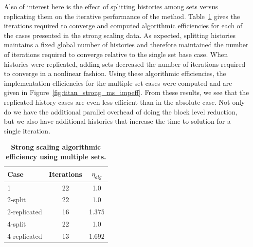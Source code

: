 Also of interest here is the effect of splitting histories among
sets versus replicating them on the iterative performance of the
method. Table~\ref{tab:ms_strong_alg_eff} gives the iterations
required to converge and computed algorithmic efficiencies for each of
the cases presented in the strong scaling data. As expected, splitting
histories maintains a fixed global number of histories and therefore
maintained the number of iterations required to converge relative to
the single set base case. When histories were replicated, adding sets
decreased the number of iterations required to converge in a nonlinear
fashion. Using these algorithmic efficiencies, the implementation
efficiencies for the multiple set cases were computed and are given in
Figure~\ref{fig:titan_strong_ms_impeff}. From these results, we see
that the replicated history cases are even less efficient than in the
absolute case. Not only do we have the additional parallel overhead of
doing the block level reduction, but we also have additional histories
that increase the time to solution for a single iteration.

\begin{table}[h!]
  \begin{center}
    \begin{tabular}{lcc}\hline\hline
      \multicolumn{1}{l}{Case}& 
      \multicolumn{1}{c}{Iterations}&
      \multicolumn{1}{c}{$\eta_{alg}$} \\\hline
      1 & 22 & 1.0 \\
      2-split & 22 & 1.0 \\
      2-replicated & 16 & 1.375 \\
      4-split & 22 & 1.0 \\
      4-replicated & 13 & 1.692 \\
      \hline\hline
    \end{tabular}
  \end{center}
  \caption{\textbf{Strong scaling algorithmic efficiency using
      multiple sets.}}
  \label{tab:ms_strong_alg_eff}
\end{table}

